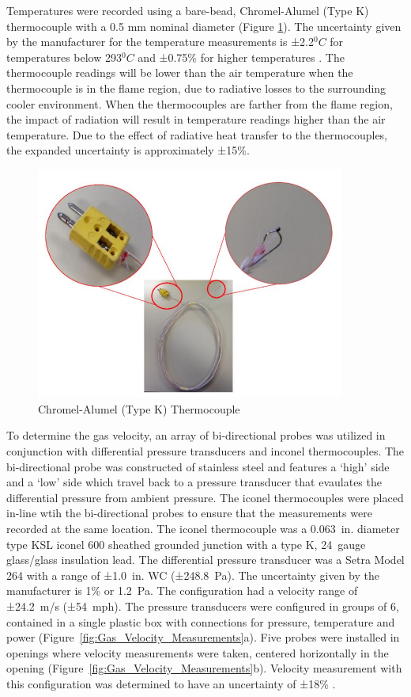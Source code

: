 \documentclass{article}
\begin{document}
Temperatures were recorded using a bare-bead, Chromel-Alumel (Type K) thermocouple with a 0.5 mm nominal diameter (Figure \ref{fig:Thermocouple}). The uncertainty given by the manufacturer for the temperature measurements is ±2.2$^0C$ for temperatures below 293$^0C$ and ±0.75\% for higher temperatures \cite{TemperatureHandbook}. The thermocouple readings will be lower than the air temperature when the thermocouple is in the flame region, due to radiative losses to the surrounding cooler environment. When the thermocouples are farther from the flame region, the impact of radiation will result in temperature readings higher than the air temperature. Due to the effect of radiative heat transfer to the thermocouples, the expanded uncertainty is approximately ±15\%.

\begin{figure} [H]
	\centering
	\includegraphics[width = 4in]{0_Images/Instrumentation/Thermocouple.jpg}
	\caption{Chromel-Alumel (Type K) Thermocouple}
	\label{fig:Thermocouple}
\end{figure}

To determine the gas velocity, an array of bi-directional probes was utilized in conjunction with differential pressure transducers and inconel thermocouples. The bi-directional probe was constructed of stainless steel and features a `high' side and a `low' side which travel back to a pressure transducer that evaulates the differential pressure from ambient pressure. The iconel thermocouples were placed in-line wtih the bi-directional probes to ensure that the measurements were recorded at the same location. The iconel thermocouple was a 0.063~in. diameter type KSL iconel 600 sheathed grounded junction with a type K, 24~gauge glass/glass insulation lead. The differential pressure transducer was a Setra Model 264 with a range of ±1.0~in. WC (±248.8~Pa). The uncertainty given by the manufacturer is 1\% or 1.2~Pa. The configuration had a velocity range of ±24.2~m/s (±54~mph). The pressure transducers were configured in groups of 6, contained in a single plastic box with connections for pressure, temperature and power (Figure~\ref{fig:Gas_Velocity_Measurements}a). Five probes were installed in openings where velocity measurements were taken, centered horizontally in the opening (Figure~\ref{fig:Gas_Velocity_Measurements}b). Velocity measurement with this configuration was determined to have an uncertainty of ±18\% \cite{BDPInPoolFires}.
\end{document}
